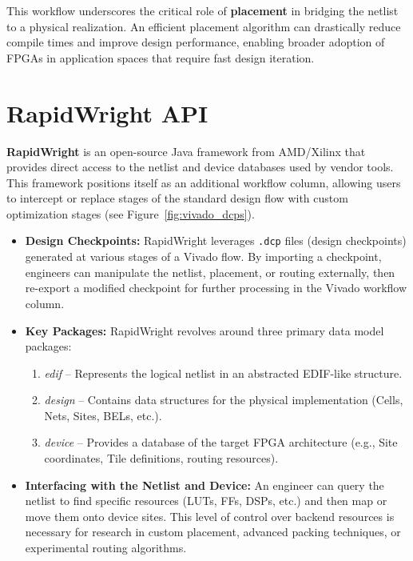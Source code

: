 \documentclass{article}
\begin{document}
\begin{multicols}{2}
\begin{enumerate}
    \end{enumerate}

    This workflow underscores the critical role of \textbf{placement} in bridging the netlist to a physical realization. 
    An efficient placement algorithm can drastically reduce compile times and improve design performance, enabling broader adoption of FPGAs in application spaces that require fast design iteration.


\section{RapidWright API}
    \label{sec:rapidwright_api}

    \textbf{RapidWright} is an open-source Java framework from AMD/Xilinx that provides direct access to the netlist and device databases used by vendor tools. 
    This framework positions itself as an additional workflow column, allowing users to intercept or replace stages of the standard design flow with custom optimization stages (see Figure~\ref{fig:vivado_dcps}).

    \begin{itemize}
    \item \textbf{Design Checkpoints:} 
        RapidWright leverages \texttt{.dcp} files (design checkpoints) generated at various stages of a Vivado flow. 
        By importing a checkpoint, engineers can manipulate the netlist, placement, or routing externally, then re-export a modified checkpoint for further processing in the Vivado workflow column.

    \item \textbf{Key Packages:} 
        RapidWright revolves around three primary data model packages:
        \begin{enumerate}
        \item \emph{edif} -- Represents the logical netlist in an abstracted EDIF-like structure.
        \item \emph{design} -- Contains data structures for the physical implementation (Cells, Nets, Sites, BELs, etc.).
        \item \emph{device} -- Provides a database of the target FPGA architecture (e.g., Site coordinates, Tile definitions, routing resources).
        \end{enumerate}

    \item \textbf{Interfacing with the Netlist and Device:} 
        An engineer can query the netlist to find specific resources (LUTs, FFs, DSPs, etc.) and then map or move them onto device sites. 
        This level of control over backend resources is necessary for research in custom placement, advanced packing techniques, or experimental routing algorithms.
    \end{itemize}


\end{multicols}
\end{document}
